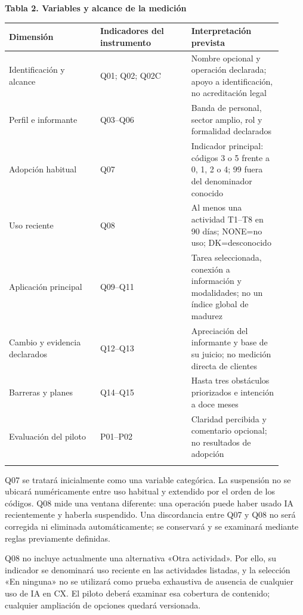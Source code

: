 \documentclass[12pt,letterpaper]{article}
\begin{document}
\noindent \textbf{Tabla 2. Variables y alcance de la medición}\par\nopagebreak
\begingroup\small{}\setlength{\tabcolsep}{4pt}\begin{longtable}{>{\raggedright\arraybackslash}p{0.303\linewidth}>{\raggedright\arraybackslash}p{0.303\linewidth}>{\raggedright\arraybackslash}p{0.303\linewidth}}
\toprule
\textbf{Dimensión} & \textbf{Indicadores del instrumento} & \textbf{Interpretación prevista} \\ \midrule\endhead
Identificación y alcance & Q01; Q02; Q02C & Nombre opcional y operación declarada; apoyo a identificación, no acreditación legal \\ \addlinespace[5pt]
Perfil e informante & Q03--Q06 & Banda de personal, sector amplio, rol y formalidad declarados \\ \addlinespace[5pt]
Adopción habitual & Q07 & Indicador principal: códigos 3 o 5 frente a 0, 1, 2 o 4; 99 fuera del denominador conocido \\ \addlinespace[5pt]
Uso reciente & Q08 & Al menos una actividad T1--T8 en 90 días; NONE=no uso; DK=desconocido \\ \addlinespace[5pt]
Aplicación principal & Q09--Q11 & Tarea seleccionada, conexión a información y modalidades; no un índice global de madurez \\ \addlinespace[5pt]
Cambio y evidencia declarados & Q12--Q13 & Apreciación del informante y base de su juicio; no medición directa de clientes \\ \addlinespace[5pt]
Barreras y planes & Q14--Q15 & Hasta tres obstáculos priorizados e intención a doce meses \\ \addlinespace[5pt]
Evaluación del piloto & P01--P02 & Claridad percibida y comentario opcional; no resultados de adopción \\ \addlinespace[5pt]
\bottomrule\end{longtable}\endgroup
Q07 se tratará inicialmente como una variable categórica. La suspensión no se ubicará numéricamente entre uso habitual y extendido por el orden de los códigos. Q08 mide una ventana diferente: una operación puede haber usado IA recientemente y haberla suspendido. Una discordancia entre Q07 y Q08 no será corregida ni eliminada automáticamente; se conservará y se examinará mediante reglas previamente definidas.

Q08 no incluye actualmente una alternativa «Otra actividad». Por ello, su indicador se denominará uso reciente en las actividades listadas, y la selección «En ninguna» no se utilizará como prueba exhaustiva de ausencia de cualquier uso de IA en CX. El piloto deberá examinar esa cobertura de contenido; cualquier ampliación de opciones quedará versionada.
\end{document}
